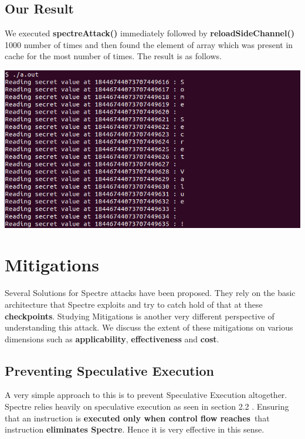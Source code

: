 \documentclass[12pt]{article}
\begin{document}
  
\subsection{Our Result}

We executed \textbf{spectreAttack()} immediately followed by \textbf{reloadSideChannel()} 1000 number of times and then found the element of array which was present in cache for the most number of times. The result is as follows.

\vspace*{0.5 cm}
	{\centering
    \vspace*{0.5 cm}
\includegraphics[scale = 0.6]{spectre.png}\\[1.0 cm]}


\newpage
\section{Mitigations\cite{Kocher2018spectre}}
Several Solutions for Spectre attacks have been proposed. They rely on the basic architecture that Spectre exploits and try to catch hold of that at these \textbf{checkpoints}. Studying Mitigations is another very different perspective of understanding this attack. We discuss the extent of these mitigations on various dimensions such as \textbf{applicability}, \textbf{effectiveness} and \textbf{cost}.
\subsection{Preventing Speculative Execution}
A very simple approach to this is to prevent Speculative Execution altogether. Spectre relies heavily on speculative execution as seen in section 2.2 . Ensuring that an instruction is \textbf{executed only when control flow reaches}\ that instruction \textbf{eliminates Spectre}. Hence it is very effective in this sense.\\
\end{document}

